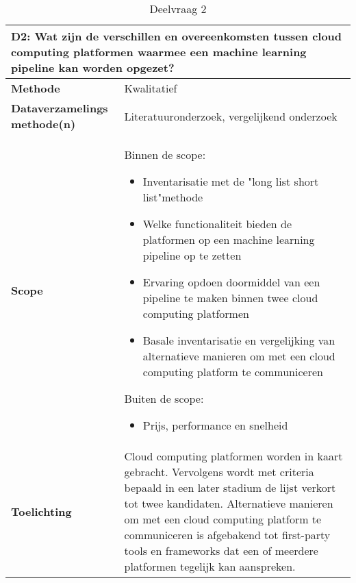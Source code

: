 \begin{table}[hbt!]
\centering
\begin{tabular}{|p{.215\linewidth}|p{.72\linewidth}|}
\hline
\multicolumn{2}{|p{.97\linewidth}|}{\textbf{D2: Wat zijn de verschillen en overeenkomsten tussen cloud computing platformen waarmee een machine learning pipeline kan worden opgezet?}} \\ \hline
  \textbf{Methode}&
    Kwalitatief
  \\ \hline
  \textbf{Dataverzamelings methode(n)}&
    Literatuuronderzoek, vergelijkend onderzoek
  \\ \hline
  \textbf{Scope}&
    Binnen de scope:
    \begin{itemize}
      \item Inventarisatie met de "long list short list"\space methode
      \item Welke functionaliteit bieden de platformen op een machine learning pipeline op te zetten
      \item Ervaring opdoen doormiddel van een pipeline te maken binnen twee cloud computing platformen
      \item Basale inventarisatie en vergelijking van alternatieve manieren om met een cloud computing platform te communiceren
    \end{itemize}
    Buiten de scope:
    \begin{itemize}
      \item Prijs, performance en snelheid
    \end{itemize}
  \\ \hline
  \textbf{Toelichting}&
    Cloud computing platformen worden in kaart gebracht. Vervolgens wordt met criteria bepaald in een later stadium de lijst verkort tot twee kandidaten. Alternatieve manieren om met een cloud computing platform te communiceren is afgebakend tot first-party tools en frameworks dat een of meerdere platformen tegelijk kan aanspreken.
  \\ \hline
\end{tabular}
\caption{Deelvraag 2}
\label{table:sq2}
\end{table}

